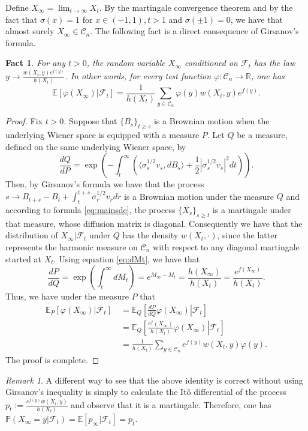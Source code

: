 \documentclass[12pt]{article}
\def \RR {\mathbb R}
\def \EE {\mathbb E}
\def \PP {\mathbb P}
\def \FF {\mathcal{F}}
\def \DC {\mathcal{C}_n}
\newtheorem{fact}[theorem]{Fact}
\theoremstyle{definition}
\theoremstyle{remark}
\newtheorem{remark}{Remark}
\begin{document}
Define $X_\infty = \lim_{t \to \infty} X_t$. By the martingale convergence theorem and by the fact that $\sigma(x) = 1$ for $x \in (-1,1), t>1$ and $\sigma(\pm 1) = 0$, we have that almost surely $X_\infty \in \DC$. The following fact is a direct consequence of Girsanov's formula.
\begin{fact}
For any $t>0$, the random variable $X_\infty$ conditioned on $\FF_t$ has the law $y \to \frac{w(X_t,y) e^{f(y)}}{h(X_t)}$. In other words, for every test function $\varphi: \DC \to \RR$, one has
\begin{equation}\label{eq:com}
\EE \left [ \varphi(X_\infty) | \FF_t \right ] = \frac{1}{h(X_t)} \sum_{y \in \DC} \varphi(y) w(X_t,y) e^{f(y)}.
\end{equation}
\end{fact}
\begin{proof}
Fix $t>0$. Suppose that $\{B_s\}_{t \geq s}$ is a Brownian motion when the underlying Wiener space is equipped with a measure $P$. Let $Q$ be a measure, defined on the same underlying Wiener space, by
$$
\frac{dQ}{dP} = \exp \left (  - \int_t^\infty \left (\langle \sigma_s^{1/2} v_s, d B_s \rangle + \frac{1}{2} \left |\sigma_s^{1/2} v_s \right |^2 dt \right ) \right ).
$$
Then, by Girsanov's formula we have that the process $s \to B_{t+s} - B_t + \int_t^{t+s} \sigma_r^{1/2} v_r dr$ is a Brownian motion under the measure $Q$ and according to formula \eqref{eq:mainsde}, the process $\{X_s \}_{s \geq t}$ is a martingale under that measure, whose diffusion matrix is diagonal. Consequently we have that the distribution of $X_\infty | \FF_t$ under $Q$ has the density $w(X_t, \cdot)$, since the latter represents the harmonic measure on $\DC$ with respect to any diagonal martingale started at $X_t$. Using equation \eqref{eq:dMt}, we have that
$$
\frac{dP}{dQ} = \exp \left ( \int_t^\infty d M_t \right ) = e^{M_\infty - M_t} = \frac{h(X_\infty)}{h(X_t)} = \frac{e^{f(X_\infty)}}{h(X_t)}.
$$
Thus, we have under the measure $P$ that
\begin{align*}
\EE_P[\varphi(X_\infty) | \FF_t] ~& = \left .\EE_Q \left [ \frac{dP}{dQ} \varphi(X_\infty)  \right | \FF_t\right ] \\
& = \left . \EE_Q \left [ \frac{e^f(X_\infty)}{h(X_t)} \varphi(X_\infty) \right | \FF_t \right ] \\
& = \frac{1}{h(X_t)}\sum_{y \in \DC} e^{f(y)} w(X_t, y) \varphi(y).
\end{align*}
The proof is complete.
\end{proof}
\begin{remark}
A different way to see that the above identity is correct without using Girsanov's inequality is simply to calculate the It\^o differential of the process $p_t := \frac{e^{f(y)} w(X_t,y) }{ h(X_t)}$ and observe that it is a martingale. Therefore, one has $\PP(X_\infty = y | \FF_t) = \EE[p_\infty | \FF_t] = p_t$.
\end{remark}
\end{document}
